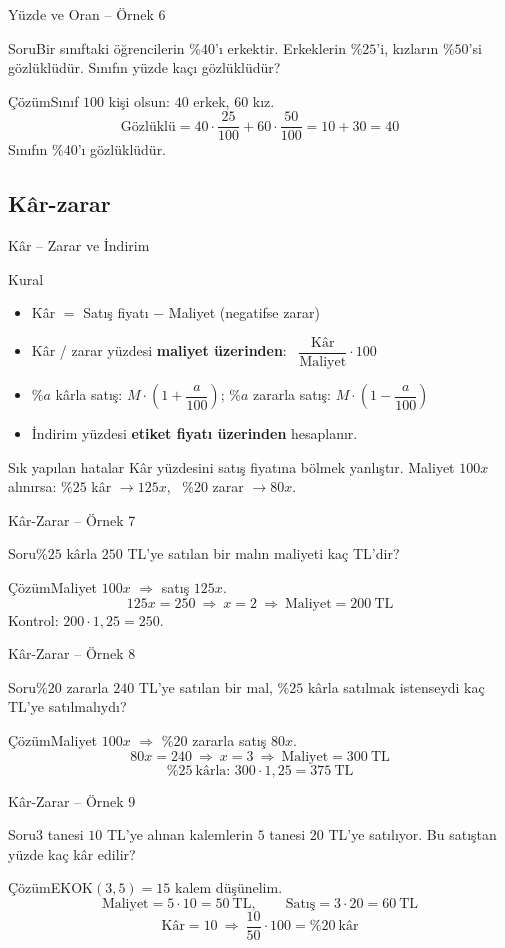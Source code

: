 \documentclass[aspectratio=169,11pt]{beamer}
\newcommand{\soru}[3]{%
\begin{frame}{#1}
  \begin{block}{Soru}\large #2\end{block}
  \pause
  \begin{exampleblock}{Çözüm}\large #3\end{exampleblock}
\end{frame}}
\begin{document}
\soru{Yüzde ve Oran -- Örnek 6}
{Bir sınıftaki öğrencilerin \(\%40\)'ı erkektir. Erkeklerin \(\%25\)'i, kızların \(\%50\)'si gözlüklüdür. Sınıfın yüzde kaçı gözlüklüdür?}
{Sınıf \(100\) kişi olsun: \(40\) erkek, \(60\) kız.
\[\text{Gözlüklü}=40\cdot\frac{25}{100}+60\cdot\frac{50}{100}=10+30=40\]
Sınıfın \(\%40\)'ı gözlüklüdür.}

\subsection{Kâr-zarar}
\begin{frame}{Kâr -- Zarar ve İndirim}
\begin{block}{Kural}
\begin{itemize}
\item Kâr \(=\) Satış fiyatı \(-\) Maliyet \quad (negatifse zarar)
\item Kâr / zarar yüzdesi \textbf{maliyet üzerinden}: \ \(\dfrac{\text{Kâr}}{\text{Maliyet}}\cdot 100\)
\item \(\%a\) kârla satış: \(M\cdot\left(1+\dfrac{a}{100}\right)\); \quad \(\%a\) zararla satış: \(M\cdot\left(1-\dfrac{a}{100}\right)\)
\item İndirim yüzdesi \textbf{etiket fiyatı üzerinden} hesaplanır.
\end{itemize}
\end{block}
\begin{alertblock}{Sık yapılan hatalar}
Kâr yüzdesini satış fiyatına bölmek yanlıştır. Maliyet \(100x\) alınırsa: \(\%25\) kâr \(\to 125x\), \ \(\%20\) zarar \(\to 80x\).
\end{alertblock}
\end{frame}

\soru{Kâr-Zarar -- Örnek 7}
{\(\%25\) kârla \(250\) TL'ye satılan bir malın maliyeti kaç TL'dir?}
{Maliyet \(100x\) \(\Rightarrow\) satış \(125x\).
\[125x=250\ \Rightarrow\ x=2\ \Rightarrow\ \text{Maliyet}=200\ \text{TL}\]
Kontrol: \(200\cdot 1{,}25=250\).}

\soru{Kâr-Zarar -- Örnek 8}
{\(\%20\) zararla \(240\) TL'ye satılan bir mal, \(\%25\) kârla satılmak istenseydi kaç TL'ye satılmalıydı?}
{Maliyet \(100x\) \(\Rightarrow\) \(\%20\) zararla satış \(80x\).
\[80x=240\ \Rightarrow\ x=3\ \Rightarrow\ \text{Maliyet}=300\ \text{TL}\]
\[\%25\ \text{kârla: } 300\cdot 1{,}25=375\ \text{TL}\]}

\soru{Kâr-Zarar -- Örnek 9}
{\(3\) tanesi \(10\) TL'ye alınan kalemlerin \(5\) tanesi \(20\) TL'ye satılıyor. Bu satıştan yüzde kaç kâr edilir?}
{EKOK\((3,5)=15\) kalem düşünelim.
\[\text{Maliyet}=5\cdot 10=50\ \text{TL},\qquad \text{Satış}=3\cdot 20=60\ \text{TL}\]
\[\text{Kâr}=10\ \Rightarrow\ \frac{10}{50}\cdot 100=\%20\ \text{kâr}\]}
\end{document}
